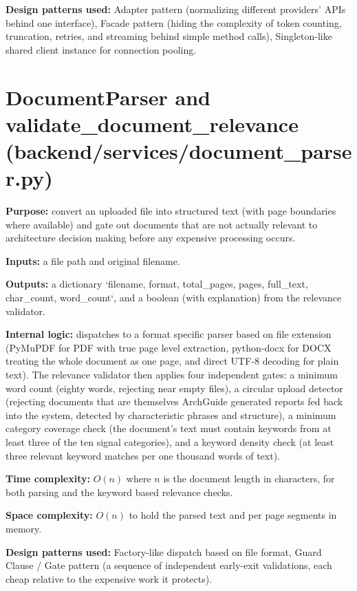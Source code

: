 \documentclass[11pt,a4paper]{report}
\begin{document}
\textbf{Design patterns used:} Adapter pattern (normalizing different providers' APIs behind one interface), Facade pattern (hiding the complexity of token counting, truncation, retries, and streaming behind simple method calls), Singleton-like shared client instance for connection pooling.

\section{DocumentParser and validate\_document\_relevance (backend/services/document\_parser.py)}

\textbf{Purpose:} convert an uploaded file into structured text (with page boundaries where available) and gate out documents that are not actually relevant to architecture decision making before any expensive processing occurs.

\textbf{Inputs:} a file path and original filename.

\textbf{Outputs:} a dictionary `{filename, format, total_pages, pages, full_text, char_count, word_count}`, and a boolean (with explanation) from the relevance validator.

\textbf{Internal logic:} dispatches to a format specific parser based on file extension (PyMuPDF for PDF with true page level extraction, python-docx for DOCX treating the whole document as one page, and direct UTF-8 decoding for plain text). The relevance validator then applies four independent gates: a minimum word count (eighty words, rejecting near empty files), a circular upload detector (rejecting documents that are themselves ArchGuide generated reports fed back into the system, detected by characteristic phrases and structure), a minimum category coverage check (the document's text must contain keywords from at least three of the ten signal categories), and a keyword density check (at least three relevant keyword matches per one thousand words of text).

\textbf{Time complexity:} $O(n)$ where $n$ is the document length in characters, for both parsing and the keyword based relevance checks.

\textbf{Space complexity:} $O(n)$ to hold the parsed text and per page segments in memory.

\textbf{Design patterns used:} Factory-like dispatch based on file format, Guard Clause / Gate pattern (a sequence of independent early-exit validations, each cheap relative to the expensive work it protects).
\end{document}
